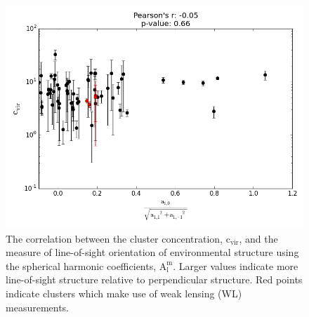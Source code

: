 \begin{figure}
\begin{center}
\includegraphics[width=\textwidth]{images/ClusterEnvironment/Conc_Corr2.png}
\end{center}
\caption[Concentration - $\mathrm{A_{l}^{m}}$ Correlation]{The correlation
  between the cluster concentration, $\mathrm{c_{vir}}$, and the measure of
  line-of-sight orientation of environmental structure using the spherical
  harmonic coefficients, $\mathrm{A_{l}^{m}}$. Larger values indicate more
  line-of-sight structure relative to perpendicular structure. Red points indicate clusters
which make use of weak lensing (WL) measurements.}
\end{figure}

